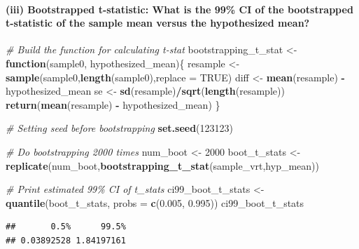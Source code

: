 \documentclass[
]{article}
\newenvironment{Shaded}{\begin{snugshade}}{\end{snugshade}}
\newcommand{\AttributeTok}[1]{\textcolor[rgb]{0.13,0.29,0.53}{#1}}
\newcommand{\CommentTok}[1]{\textcolor[rgb]{0.56,0.35,0.01}{\textit{#1}}}
\newcommand{\ConstantTok}[1]{\textcolor[rgb]{0.56,0.35,0.01}{#1}}
\newcommand{\ControlFlowTok}[1]{\textcolor[rgb]{0.13,0.29,0.53}{\textbf{#1}}}
\newcommand{\DecValTok}[1]{\textcolor[rgb]{0.00,0.00,0.81}{#1}}
\newcommand{\FloatTok}[1]{\textcolor[rgb]{0.00,0.00,0.81}{#1}}
\newcommand{\FunctionTok}[1]{\textcolor[rgb]{0.13,0.29,0.53}{\textbf{#1}}}
\newcommand{\NormalTok}[1]{#1}
\newcommand{\OtherTok}[1]{\textcolor[rgb]{0.56,0.35,0.01}{#1}}
\newcommand{\SpecialCharTok}[1]{\textcolor[rgb]{0.81,0.36,0.00}{\textbf{#1}}}
\begin{document}
\hypertarget{iii-bootstrapped-t-statistic-what-is-the-99-ci-of-the-bootstrapped-t-statistic-of-the-sample-mean-versus-the-hypothesized-mean}{%
\paragraph{(iii) Bootstrapped t-statistic: What is the 99\% CI of the
bootstrapped t-statistic of the sample mean versus the hypothesized
mean?}\label{iii-bootstrapped-t-statistic-what-is-the-99-ci-of-the-bootstrapped-t-statistic-of-the-sample-mean-versus-the-hypothesized-mean}}

\begin{Shaded}
\begin{Highlighting}[]
\CommentTok{\# Build the function for calculating t{-}stat}
\NormalTok{bootstrapping\_t\_stat }\OtherTok{\textless{}{-}} \ControlFlowTok{function}\NormalTok{(sample0, hypothesized\_mean)\{}
\NormalTok{  resample }\OtherTok{\textless{}{-}} \FunctionTok{sample}\NormalTok{(sample0,}\FunctionTok{length}\NormalTok{(sample0),}\AttributeTok{replace =} \ConstantTok{TRUE}\NormalTok{)}
\NormalTok{  diff }\OtherTok{\textless{}{-}} \FunctionTok{mean}\NormalTok{(resample) }\SpecialCharTok{{-}}\NormalTok{ hypothesized\_mean}
\NormalTok{  se }\OtherTok{\textless{}{-}} \FunctionTok{sd}\NormalTok{(resample)}\SpecialCharTok{/}\FunctionTok{sqrt}\NormalTok{(}\FunctionTok{length}\NormalTok{(resample))}
  \FunctionTok{return}\NormalTok{(}\FunctionTok{mean}\NormalTok{(resample) }\SpecialCharTok{{-}}\NormalTok{ hypothesized\_mean)}
\NormalTok{\}}

\CommentTok{\# Setting seed before bootstrapping}
\FunctionTok{set.seed}\NormalTok{(}\DecValTok{123123}\NormalTok{)}

\CommentTok{\# Do bootstrapping 2000 times}
\NormalTok{num\_boot }\OtherTok{\textless{}{-}} \DecValTok{2000}
\NormalTok{boot\_t\_stats }\OtherTok{\textless{}{-}} \FunctionTok{replicate}\NormalTok{(num\_boot,}\FunctionTok{bootstrapping\_t\_stat}\NormalTok{(sample\_vrt,hyp\_mean))}

\CommentTok{\# Print estimated 99\% CI of t\_stats}
\NormalTok{ci99\_boot\_t\_stats }\OtherTok{\textless{}{-}} \FunctionTok{quantile}\NormalTok{(boot\_t\_stats, }\AttributeTok{probs =} \FunctionTok{c}\NormalTok{(}\FloatTok{0.005}\NormalTok{, }\FloatTok{0.995}\NormalTok{))}
\NormalTok{ci99\_boot\_t\_stats}
\end{Highlighting}
\end{Shaded}

\begin{verbatim}
##       0.5%      99.5% 
## 0.03892528 1.84197161
\end{verbatim}
\end{document}
